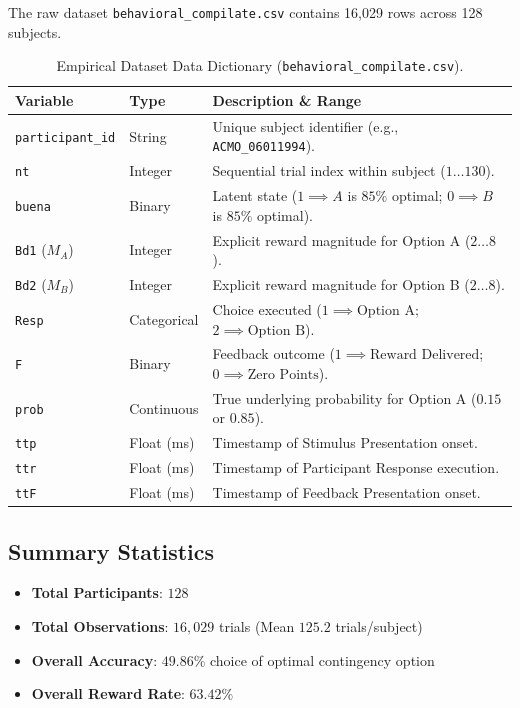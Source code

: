 \documentclass[11pt,a4paper]{article}
\begin{document}
The raw dataset \texttt{behavioral\_compilate.csv} contains 16,029 rows across 128 subjects.

\begin{table}[H]
\centering
\caption{Empirical Dataset Data Dictionary (\texttt{behavioral\_compilate.csv}).}
\label{tab:data_dict}
\vspace{0.5em}
\footnotesize
\begin{tabular}{l l l}
\toprule
\textbf{Variable} & \textbf{Type} & \textbf{Description \& Range} \\
\midrule
\texttt{participant\_id} & String & Unique subject identifier (e.g., \texttt{ACMO\_06011994}). \\
\texttt{nt} & Integer & Sequential trial index within subject ($1 \dots 130$). \\
\texttt{buena} & Binary & Latent state ($1 \implies A$ is $85\%$ optimal; $0 \implies B$ is $85\%$ optimal). \\
\texttt{Bd1} ($M_A$) & Integer & Explicit reward magnitude for Option A ($2 \dots 8$). \\
\texttt{Bd2} ($M_B$) & Integer & Explicit reward magnitude for Option B ($2 \dots 8$). \\
\texttt{Resp} & Categorical & Choice executed ($1 \implies \text{Option A}$; $2 \implies \text{Option B}$). \\
\texttt{F} & Binary & Feedback outcome ($1 \implies \text{Reward Delivered}$; $0 \implies \text{Zero Points}$). \\
\texttt{prob} & Continuous & True underlying probability for Option A ($0.15$ or $0.85$). \\
\texttt{ttp} & Float (ms) & Timestamp of Stimulus Presentation onset. \\
\texttt{ttr} & Float (ms) & Timestamp of Participant Response execution. \\
\texttt{ttF} & Float (ms) & Timestamp of Feedback Presentation onset. \\
\bottomrule
\end{tabular}
\end{table}

\subsection{Summary Statistics}
\begin{itemize}
    \item \textbf{Total Participants}: $128$
    \item \textbf{Total Observations}: $16,029$ trials (Mean $125.2$ trials/subject)
    \item \textbf{Overall Accuracy}: $49.86\%$ choice of optimal contingency option
    \item \textbf{Overall Reward Rate}: $63.42\%$
\end{itemize}
\end{document}
